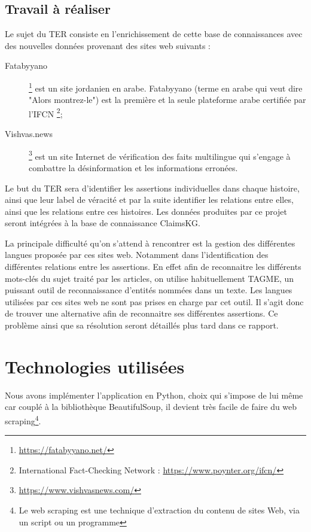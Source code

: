 \documentclass[oneside,13pt,a4paper]{report}
\begin{document}
\subsection{Travail à réaliser}

Le sujet du TER consiste en l’enrichissement de cette base de connaissances avec des nouvelles données provenant des sites web suivants :

\begin{description}
	\item[Fatabyyano]\footnote{\url{https://fatabyyano.net/}} est un site jordanien en arabe. Fatabyyano (terme en arabe qui veut dire "Alors montrez-le") est la première et la seule plateforme arabe certifiée par l'IFCN \footnote{International Fact-Checking Network : \url{https://www.poynter.org/ifcn/}};
	\item[Vishvas.news]\footnote{\url{https://www.vishvasnews.com/}} est un site Internet de vérification des faits multilingue qui s'engage à combattre la désinformation et les informations erronées.
\end{description}

Le but du TER sera d’identifier les assertions individuelles dans chaque histoire, ainsi que leur label de véracité et par la suite identifier les relations entre elles, ainsi que les relations entre ces histoires. Les données produites par ce projet seront intégrées à la base de connaissance ClaimsKG.

La principale difficulté qu'on s'attend à rencontrer est la gestion des différentes langues proposée par ces sites web. Notamment dans l'identification des différentes relations entre les assertions. En effet afin de reconnaitre les différents mots-clés du sujet traité par les articles, on utilise habituellement TAGME, un puissant outil de reconnaissance d'entités nommées dans un texte. Les langues utilisées par ces sites web ne sont pas prises en charge par cet outil. Il s'agit donc de trouver une alternative afin de reconnaitre ses différentes assertions. Ce problème ainsi que sa résolution seront détaillés plus tard dans ce rapport.

\section{Technologies utilisées}

Nous avons implémenter l'application en Python, choix qui s'impose de lui même car couplé à la bibliothèque BeautifulSoup, il devient très facile de faire du web scraping\footnote{Le web scraping est une technique d'extraction du contenu de sites Web, via un script ou un programme}.
\end{document}
